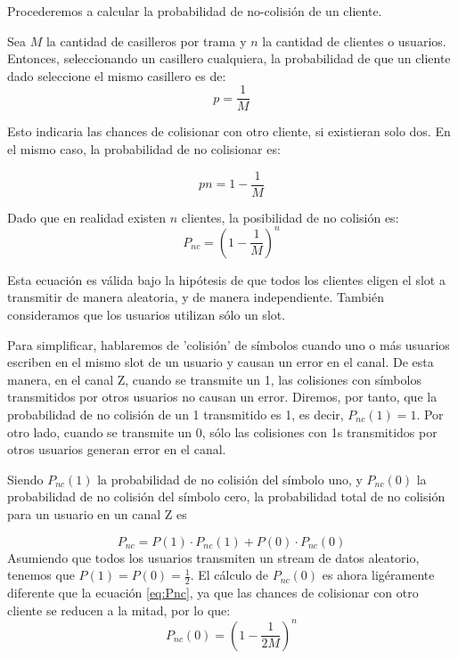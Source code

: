 Procederemos a calcular la probabilidad de no-colisión de un cliente.

Sea $M$ la cantidad de casilleros por trama y $n$ la cantidad de clientes o usuarios.
Entonces, seleccionando un casillero cualquiera, la probabilidad de que un cliente dado seleccione el mismo casillero es de:
\begin{equation}
p=\frac{1}{M}
\end{equation}

Esto indicaria las chances de colisionar con otro cliente, si existieran solo dos. En el mismo caso, la probabilidad de no colisionar es:

\begin{equation}
pn=1-\frac{1}{M}
\end{equation}


Dado que en realidad existen $n$ clientes, la posibilidad de no colisión es:
\begin{equation}
\label{eq:Pnc}
P_{nc}=\left(1-\frac{1}{M}\right)^{n}
\end{equation}

Esta ecuación es válida bajo la hipótesis de que todos los clientes eligen el slot a transmitir de manera aleatoria, y de manera independiente. También consideramos que los usuarios utilizan sólo un slot.

Para simplificar, hablaremos de 'colisión' de símbolos cuando uno o más usuarios escriben en el mismo slot de un usuario y causan un error en el canal. De esta manera, en el canal Z, cuando se transmite un 1, las colisiones con símbolos transmitidos por otros usuarios no causan un error. Diremos, por tanto, que la probabilidad de no colisión de un 1 transmitido es 1, es decir, $P_{nc}(1) = 1$. Por otro lado, cuando se transmite un 0, sólo las colisiones con 1s transmitidos por otros usuarios generan error en el canal.

Siendo $P_{nc}(1)$ la probabilidad de no colisión del símbolo uno, y $P_{nc}(0)$ la probabilidad de no colisión del símbolo cero, la probabilidad total de no colisión para un usuario en un canal Z es

\begin{equation}
\label{eq:PncSym}
P_{nc}=P(1)\cdot P_{nc}(1) + P(0) \cdot P_{nc}(0) 
\end{equation}
Asumiendo que todos los usuarios transmiten un stream de datos aleatorio, tenemos que $P(1)=P(0)=\frac{1}{2}$.
El cálculo de $P_{nc}(0)$ es ahora ligéramente diferente que la ecuación \ref{eq:Pnc}, ya que las chances de colisionar con otro cliente se reducen a la mitad, por lo que:
\begin{equation}
\label{eq:Pnc0}
P_{nc}(0)=\left(1-\frac{1}{2M}\right)^{n}
\end{equation}

